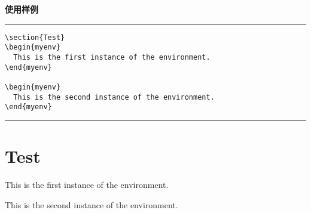 \documentclass[12pt]{article}
\newcommand{\hl}{\noindent\rule{1\linewidth}{.1em}}
\begin{document}
\textbf{使用样例}

\hl
\begin{verbatim}
\section{Test}
\begin{myenv}
  This is the first instance of the environment.
\end{myenv}

\begin{myenv}
  This is the second instance of the environment.
\end{myenv}  
\end{verbatim}
\hl


\section{Test}
\begin{themyenv}
  This is the first instance of the environment.
\end{themyenv}

\begin{themyenv}
  This is the second instance of the environment.
\end{themyenv}
\end{document}
